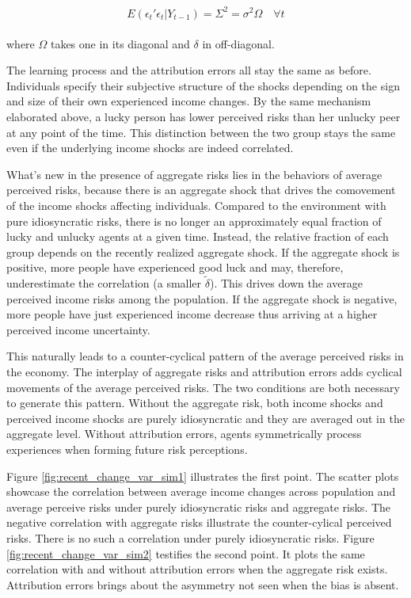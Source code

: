 \documentclass[12pt,notitlepage,onecolumn,aps,pra]{article}
\begin{document}
\begin{eqnarray}
\begin{split}
E(\epsilon_{t}'\epsilon_{t}|Y_{t-1}) = \Sigma^2 = \sigma^2\Omega \quad \forall t  
\end{split}
\end{eqnarray}

where \(\Omega\) takes one in its diagonal and \(\delta\) in
off-diagonal.

The learning process and the attribution errors all stay the same as
before. Individuals specify their subjective structure of the shocks
depending on the sign and size of their own experienced income changes.
By the same mechanism elaborated above, a lucky person has lower
perceived risks than her unlucky peer at any point of the time. This
distinction between the two group stays the same even if the underlying
income shocks are indeed correlated.

What's new in the presence of aggregate risks lies in the behaviors of
average perceived risks, because there is an aggregate shock that drives
the comovement of the income shocks affecting individuals. Compared to
the environment with pure idiosyncratic risks, there is no longer an
approximately equal fraction of lucky and unlucky agents at a given
time. Instead, the relative fraction of each group depends on the
recently realized aggregate shock. If the aggregate shock is positive,
more people have experienced good luck and may, therefore, underestimate
the correlation (a smaller \(\tilde \delta\)). This drives down the
average perceived income risks among the population. If the aggregate
shock is negative, more people have just experienced income decrease
thus arriving at a higher perceived income uncertainty.

This naturally leads to a counter-cyclical pattern of the average
perceived risks in the economy. The interplay of aggregate risks and
attribution errors adds cyclical movements of the average perceived
risks. The two conditions are both necessary to generate this pattern.
Without the aggregate risk, both income shocks and perceived income
shocks are purely idiosyncratic and they are averaged out in the
aggregate level. Without attribution errors, agents symmetrically
process experiences when forming future risk perceptions.

Figure \ref{fig:recent_change_var_sim1} illustrates the first point. The
scatter plots showcase the correlation between average income changes
across population and average perceive risks under purely idiosyncratic
risks and aggregate risks. The negative correlation with aggregate risks
illustrate the counter-cylical perceived risks. There is no such a
correlation under purely idiosyncratic risks. Figure
\ref{fig:recent_change_var_sim2} testifies the second point. It plots
the same correlation with and without attribution errors when the
aggregate risk exists. Attribution errors brings about the asymmetry not
seen when the bias is absent.
\end{document}
